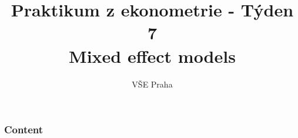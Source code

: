 \documentclass{beamer}
\title[LME]{Praktikum z ekonometrie - Týden 7 \\Mixed effect models} %
\author{VŠE Praha} %
\institute[4EK417] %
{
\medskip
\textit{Tomáš Formánek} %
}
\date{} %
\begin{document}
\begin{frame}
\titlepage %
\end{frame}
\begin{frame}
\frametitle{Content} %
\tableofcontents %
\end{frame}

\end{document}
